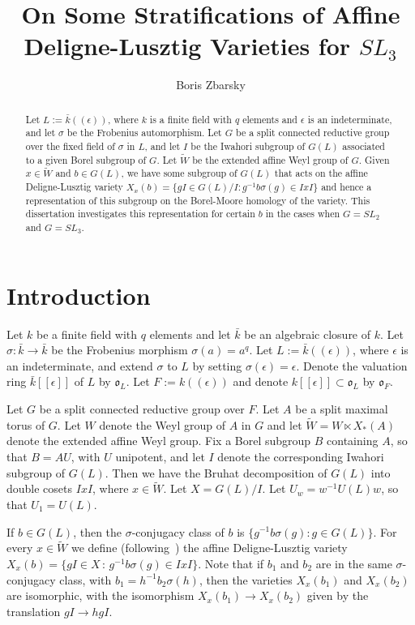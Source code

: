 \documentclass{amsart}
\theoremstyle{definition}
\def\O{\mathfrak{o}}
\def\k{\bar{k}}
\def\e{\epsilon}
\def\W{\widetilde{W}}
\def\s{\sigma}
\begin{document}
  \title{On Some Stratifications of Affine Deligne-Lusztig Varieties for $SL_3$}
  \author{Boris Zbarsky}
  \address{20 E Milton Rd, Unit 3
           Brookline, MA 02445}

  \begin{abstract}
  Let $L := \k((\e))$, where $k$ is a finite field with $q$ elements and $\e$
  is an indeterminate, and let $\s$ be the Frobenius automorphism.  Let $G$ be
  a split connected reductive group over the fixed field of $\s$ in $L$, and
  let $I$ be the Iwahori subgroup of $G(L)$ associated to a given Borel
  subgroup of $G$.  Let $\W$ be the extended affine Weyl group of $G$.  Given
  $x \in \W$ and $b \in G(L)$, we have some subgroup of $G(L)$ that acts on the
  affine Deligne-Lusztig variety $X_x(b) = \{ gI \in G(L)/I : g^{-1}b\s(g) \in
  IxI\}$ and hence a representation of this subgroup on the Borel-Moore
  homology of the variety.  This dissertation investigates this representation
  for certain $b$ in the cases when $G = SL_2$ and $G = SL_3$.
  \end{abstract}
  
  \maketitle

  \section{Introduction}
  Let $k$ be a finite field with $q$ elements and let $\k$ be an algebraic
  closure of $k$.  Let $\s:\k\to\k$ be the Frobenius morphism $\s(a) = a^q$.
  Let $L := \k((\e))$, where $\e$ is an indeterminate, and extend $\s$ to $L$
  by setting $\s(\e) = \e$.  Denote the valuation ring $\k[[\e]]$ of $L$ by
  $\O_L$.  Let $F := k((\e))$ and denote $k[[\e]] \subset \O_L$ by $\O_F$.

  Let $G$ be a split connected reductive group over $F$.  Let $A$ be a split
  maximal torus of $G$.  Let $W$ denote the Weyl group of $A$ in $G$ and let
  $\W = W \ltimes X_*(A)$ denote the extended affine Weyl group.  Fix a Borel
  subgroup $B$ containing $A$, so that $B=AU$, with $U$ unipotent, and let $I$
  denote the corresponding Iwahori subgroup of $G(L)$.  Then we have the
  Bruhat decomposition of $G(L)$ into double cosets $IxI$, where $x \in \W$.
  Let $X = G(L)/I$.  Let $U_w = w^{-1}U(L)w$, so that $U_1 = U(L)$.

  If $b \in G(L)$, then the $\s$-conjugacy class of $b$ is $\{g^{-1}b\s(g): g
  \in G(L)\}$.  For every $x \in \W$ we define (following~\cite{Kottwitz-f_nu})
  the affine Deligne-Lusztig variety $X_x(b) = \{gI \in X \,:\,
  g^{-1}b\s(g) \in IxI\}$.  Note that if $b_1$ and $b_2$ are in the same
  $\s$-conjugacy class, with $b_1 = h^{-1}b_2\s(h)$, then the varieties
  $X_x(b_1)$ and $X_x(b_2)$ are isomorphic, with the isomorphism $X_x(b_1) \to
  X_x(b_2)$ given by the translation $gI \to hgI$.
\end{document}
